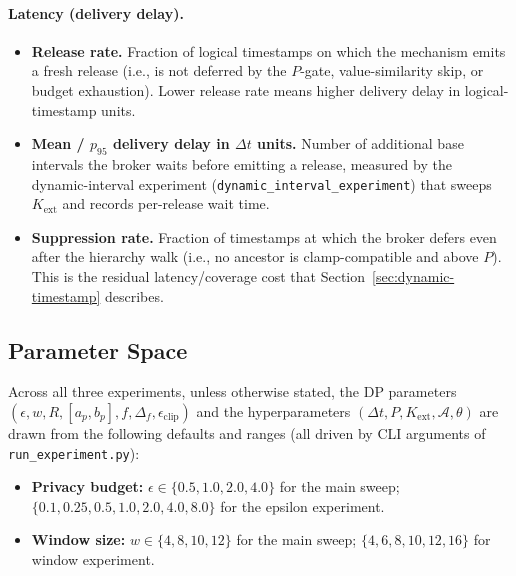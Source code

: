 \paragraph{Latency (delivery delay).}
\begin{itemize}
\item \textbf{Release rate.} Fraction of logical timestamps on which the mechanism emits a fresh release (i.e., is not deferred by the $P$-gate, value-similarity skip, or budget exhaustion). Lower release rate means higher delivery delay in logical-timestamp units.
\item \textbf{Mean / $p_{95}$ delivery delay in $\Delta t$ units.} Number of additional base intervals the broker waits before emitting a release, measured by the dynamic-interval experiment (\texttt{dynamic\_interval\_experiment}) that sweeps $K_{\text{ext}}$ and records per-release wait time.
\item \textbf{Suppression rate.} Fraction of timestamps at which the broker defers even after the hierarchy walk (i.e., no ancestor is clamp-compatible and above $P$). This is the residual latency/coverage cost that Section~\ref{sec:dynamic-timestamp} describes.
\end{itemize}

\subsection{Parameter Space}
\label{sec:params}

Across all three experiments, unless otherwise stated, the DP parameters $(\epsilon, w, R, [a_p, b_p], f, \Delta_f, \epsilon_{\text{clip}})$ and the hyperparameters $(\Delta t, P, K_{\text{ext}}, \mathcal{A}, \theta)$ are drawn from the following defaults and ranges (all driven by CLI arguments of \texttt{run\_experiment.py}):

\begin{itemize}
\item \textbf{Privacy budget:} $\epsilon \in \{0.5, 1.0, 2.0, 4.0\}$ for the main sweep; $\{0.1, 0.25, 0.5, 1.0, 2.0, 4.0, 8.0\}$ for the epsilon experiment.
\item \textbf{Window size:} $w \in \{4, 8, 10, 12\}$ for the main sweep; $\{4, 6, 8, 10, 12, 16\}$ for window experiment.
\end{itemize}


